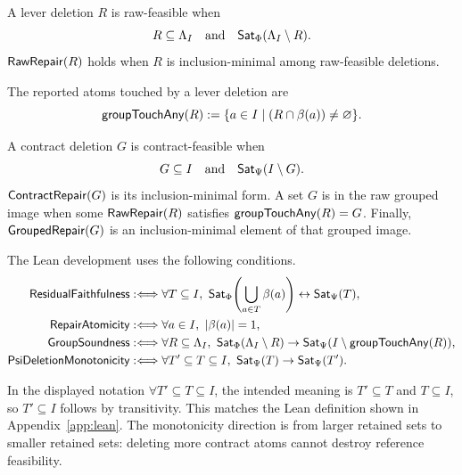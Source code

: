 \begin{definition}
A lever deletion \(R\) is raw-feasible when
\[
  R \subseteq \Lambda_I
  \quad\text{and}\quad
  \mathsf{Sat}_{\Phi}(\Lambda_I \setminus R).
\]
\(\mathsf{RawRepair}(R)\) holds when \(R\) is inclusion-minimal among raw-feasible
deletions.
\end{definition}

\begin{definition}
The reported atoms touched by a lever deletion are
\[
  \mathsf{groupTouchAny}(R)
  :=
  \{a \in I \mid (R \cap \beta(a)) \neq \varnothing\}.
\]
\end{definition}

\begin{definition}
A contract deletion \(G\) is contract-feasible when
\[
  G \subseteq I
  \quad\text{and}\quad
  \mathsf{Sat}_{\Psi}(I \setminus G).
\]
\(\mathsf{ContractRepair}(G)\) is its inclusion-minimal form.  A set \(G\) is in the
raw grouped image when some \(\mathsf{RawRepair}(R)\) satisfies
\(\mathsf{groupTouchAny}(R)=G\).  Finally, \(\mathsf{GroupedRepair}(G)\) is an
inclusion-minimal element of that grouped image.
\end{definition}

\begin{definition}
The Lean development uses the following conditions.
\begin{align*}
\mathsf{ResidualFaithfulness}
&:\Longleftrightarrow
  \forall T \subseteq I,\
  \mathsf{Sat}_{\Phi}\!\left(\bigcup_{a\in T}\beta(a)\right)
  \leftrightarrow \mathsf{Sat}_{\Psi}(T),\\
\mathsf{RepairAtomicity}
&:\Longleftrightarrow
  \forall a\in I,\ |\beta(a)|=1,\\
\mathsf{GroupSoundness}
&:\Longleftrightarrow
  \forall R\subseteq\Lambda_I,\
  \mathsf{Sat}_{\Phi}(\Lambda_I\setminus R)
  \to \mathsf{Sat}_{\Psi}(I\setminus\mathsf{groupTouchAny}(R)),\\
\mathsf{PsiDeletionMonotonicity}
&:\Longleftrightarrow
  \forall T'\subseteq T\subseteq I,\
  \mathsf{Sat}_{\Psi}(T)\to\mathsf{Sat}_{\Psi}(T').
\end{align*}
\end{definition}

In the displayed notation \(\forall T'\subseteq T\subseteq I\), the intended
meaning is \(T'\subseteq T\) and \(T\subseteq I\), so \(T'\subseteq I\) follows
by transitivity.  This matches the Lean definition shown in
Appendix~\ref{app:lean}.  The monotonicity direction is from larger retained
sets to smaller retained sets: deleting more contract atoms cannot destroy
reference feasibility.

